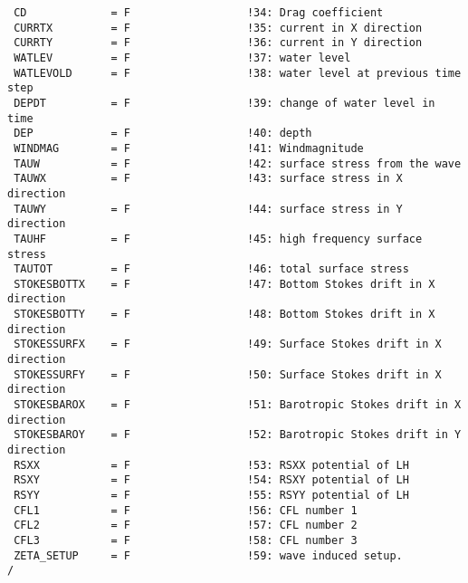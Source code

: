 \documentclass[12pt]{amsart}
\begin{document}
\begin{verbatim}
 CD             = F                  !34: Drag coefficient
 CURRTX         = F                  !35: current in X direction
 CURRTY         = F                  !36: current in Y direction
 WATLEV         = F                  !37: water level
 WATLEVOLD      = F                  !38: water level at previous time step
 DEPDT          = F                  !39: change of water level in time
 DEP            = F                  !40: depth
 WINDMAG        = F                  !41: Windmagnitude
 TAUW           = F                  !42: surface stress from the wave
 TAUWX          = F                  !43: surface stress in X direction
 TAUWY          = F                  !44: surface stress in Y direction
 TAUHF          = F                  !45: high frequency surface stress
 TAUTOT         = F                  !46: total surface stress
 STOKESBOTTX    = F                  !47: Bottom Stokes drift in X direction
 STOKESBOTTY    = F                  !48: Bottom Stokes drift in X direction
 STOKESSURFX    = F                  !49: Surface Stokes drift in X direction
 STOKESSURFY    = F                  !50: Surface Stokes drift in X direction
 STOKESBAROX    = F                  !51: Barotropic Stokes drift in X direction
 STOKESBAROY    = F                  !52: Barotropic Stokes drift in Y direction
 RSXX           = F                  !53: RSXX potential of LH
 RSXY           = F                  !54: RSXY potential of LH
 RSYY           = F                  !55: RSYY potential of LH
 CFL1           = F                  !56: CFL number 1
 CFL2           = F                  !57: CFL number 2
 CFL3           = F                  !58: CFL number 3
 ZETA_SETUP     = F                  !59: wave induced setup.
/
\end{verbatim}
\end{document}
